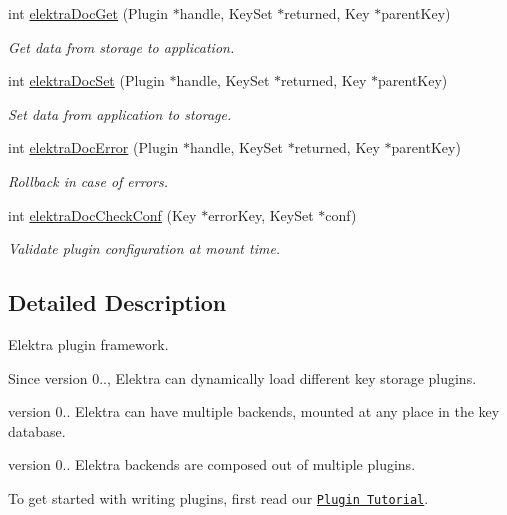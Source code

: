 \begin{DoxyCompactItemize}
int \hyperlink{group__plugin_gacb69f3441c6d84241b4362f958fbe313}{elektra\+Doc\+Get} (Plugin $\ast$handle, Key\+Set $\ast$returned, Key $\ast$parent\+Key)
\begin{DoxyCompactList}\small\item\em Get data from storage to application. \end{DoxyCompactList}\item 
int \hyperlink{group__plugin_gae65781a1deb34efc79c8cb9d9174842c}{elektra\+Doc\+Set} (Plugin $\ast$handle, Key\+Set $\ast$returned, Key $\ast$parent\+Key)
\begin{DoxyCompactList}\small\item\em Set data from application to storage. \end{DoxyCompactList}\item 
int \hyperlink{group__plugin_gad74b35f558ac7c3262f6069c5c47dc79}{elektra\+Doc\+Error} (Plugin $\ast$handle, Key\+Set $\ast$returned, Key $\ast$parent\+Key)
\begin{DoxyCompactList}\small\item\em Rollback in case of errors. \end{DoxyCompactList}\item 
int \hyperlink{group__plugin_ga1c8702efe0f3853c2d7ecca0889f78e8}{elektra\+Doc\+Check\+Conf} (Key $\ast$error\+Key, Key\+Set $\ast$conf)
\begin{DoxyCompactList}\small\item\em Validate plugin configuration at mount time. \end{DoxyCompactList}\end{DoxyCompactItemize}


\subsection{Detailed Description}
Elektra plugin framework. 

\begin{DoxySince}{Since}
version 0.., Elektra can dynamically load different key storage plugins.

version 0.. Elektra can have multiple backends, mounted at any place in the key database.

version 0.. Elektra backends are composed out of multiple plugins.
\end{DoxySince}
To get started with writing plugins, first read our \href{doc_tutorials_plugins_md.html}{\tt Plugin Tutorial}.

